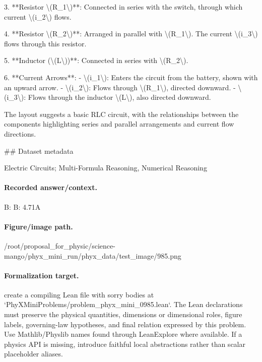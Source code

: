 3. **Resistor \textbackslash{}(R\_1\textbackslash{})**: Connected in series with the switch, through which current \textbackslash{}(i\_2\textbackslash{}) flows.

4. **Resistor \textbackslash{}(R\_2\textbackslash{})**: Arranged in parallel with \textbackslash{}(R\_1\textbackslash{}). The current \textbackslash{}(i\_3\textbackslash{}) flows through this resistor.

5. **Inductor (\textbackslash{}(L\textbackslash{}))**: Connected in series with \textbackslash{}(R\_2\textbackslash{}).

6. **Current Arrows**:
   - \textbackslash{}(i\_1\textbackslash{}): Enters the circuit from the battery, shown with an upward arrow.
   - \textbackslash{}(i\_2\textbackslash{}): Flows through \textbackslash{}(R\_1\textbackslash{}), directed downward.
   - \textbackslash{}(i\_3\textbackslash{}): Flows through the inductor \textbackslash{}(L\textbackslash{}), also directed downward.

The layout suggests a basic RLC circuit, with the relationships between the components highlighting series and parallel arrangements and current flow directions.

\#\# Dataset metadata

Electric Circuits; Multi-Formula Reasoning, Numerical Reasoning

\paragraph{Recorded answer/context.}
B: B: 4.71A

\paragraph{Figure/image path.}
/root/proposal\_for\_physic/science-mango/phyx\_mini\_run/phyx\_data/test\_image/985.png

\paragraph{Formalization target.}
create a compiling Lean file with sorry bodies at `PhyXMiniProblems/problem\_phyx\_mini\_0985.lean`. The Lean declarations must preserve the physical quantities, dimensions or dimensional roles, figure labels, governing-law hypotheses, and final relation expressed by this problem.
Use Mathlib/Physlib names found through LeanExplore where available. If a physics API is missing, introduce faithful local abstractions rather than scalar placeholder aliases.

